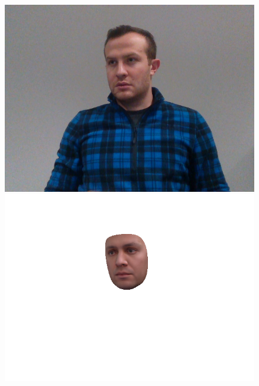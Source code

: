 \begin{figure}[h]
    \begin{minipage}{.325\textwidth}
      \centering
      \includegraphics[width=0.99\textwidth]{Figures/dataset/target/5.png}
    \end{minipage}
    \begin{minipage}{.325\textwidth}
      \centering
      \includegraphics[width=0.99\textwidth]{Figures/dataset/our/5old.png}
    \end{minipage}
    \begin{minipage}{.325\textwidth}
      \centering

\end{minipage}
\end{figure}
